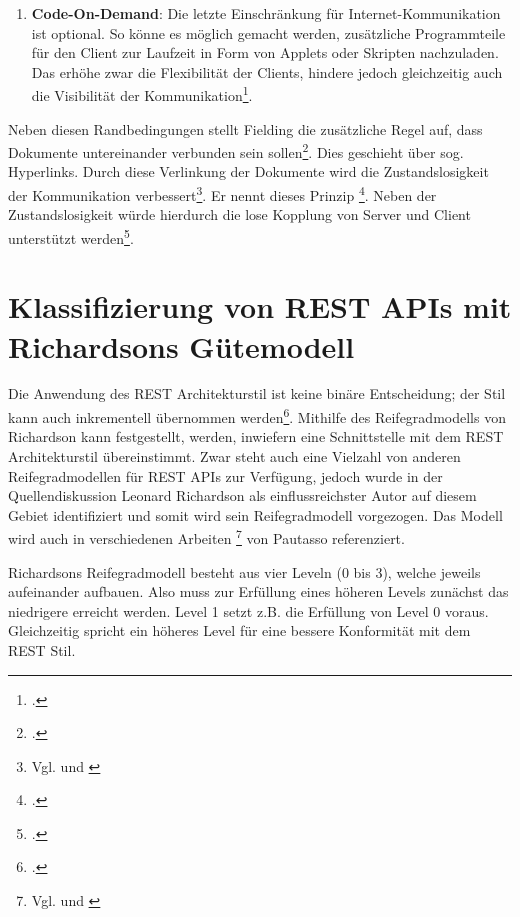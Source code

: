 \begin{enumerate}
    \item \textbf{Code-On-Demand}: Die letzte Einschränkung für Internet-Kommunikation ist optional. So könne es möglich gemacht werden, zusätzliche Programmteile für den Client zur Laufzeit in Form von Applets oder Skripten nachzuladen. Das erhöhe zwar die Flexibilität der Clients, hindere jedoch gleichzeitig auch die Visibilität der Kommunikation\footcite[Vgl. ][S. 84f]{fielding_architectural_2000}.
\end{enumerate}

Neben diesen Randbedingungen stellt Fielding die zusätzliche Regel auf, dass Dokumente untereinander verbunden sein sollen\footcite[Vgl. ][S. 76]{fielding_architectural_2000}. Dies geschieht über sog. Hyperlinks. Durch diese Verlinkung der Dokumente wird die Zustandslosigkeit der Kommunikation verbessert\footnote{Vgl. \cite[S. 807]{pautasso_restful_2008} und \cite[S. 86]{franch_detection_2014}}. Er nennt dieses Prinzip \footcite[Vgl. ][S. 3]{pautasso_restful_2014}. Neben der Zustandslosigkeit würde hierdurch die lose Kopplung von Server und Client unterstützt werden\footcite[Vgl. ][S. 4]{tilkov_rest_2015}.

\section{Klassifizierung von REST APIs mit Richardsons Gütemodell}\label{section:klassifizierung-von-rest}

Die Anwendung des REST Architekturstil ist keine binäre Entscheidung; der Stil kann auch inkrementell übernommen werden\footcite[Vgl. ][S. 4]{pautasso_restful_2014}. Mithilfe des Reifegradmodells von Richardson kann festgestellt, werden, inwiefern eine Schnittstelle mit dem REST Architekturstil übereinstimmt. Zwar steht auch eine Vielzahl von anderen Reifegradmodellen für REST APIs zur Verfügung, jedoch wurde in der Quellendiskussion Leonard Richardson als einflussreichster Autor auf diesem Gebiet identifiziert und somit wird sein Reifegradmodell vorgezogen. Das Modell wird auch in verschiedenen Arbeiten \footnote{Vgl. \cite[S. 807]{pautasso_restful_2008} und \cite[S. 4]{pautasso_restful_2014}} von Pautasso referenziert.

Richardsons Reifegradmodell besteht aus vier Leveln (0 bis 3), welche jeweils aufeinander aufbauen. Also muss zur Erfüllung eines höheren Levels zunächst das niedrigere erreicht werden. Level 1 setzt z.B. die Erfüllung von Level 0 voraus. Gleichzeitig spricht ein höheres Level für eine bessere Konformität mit dem REST Stil.

